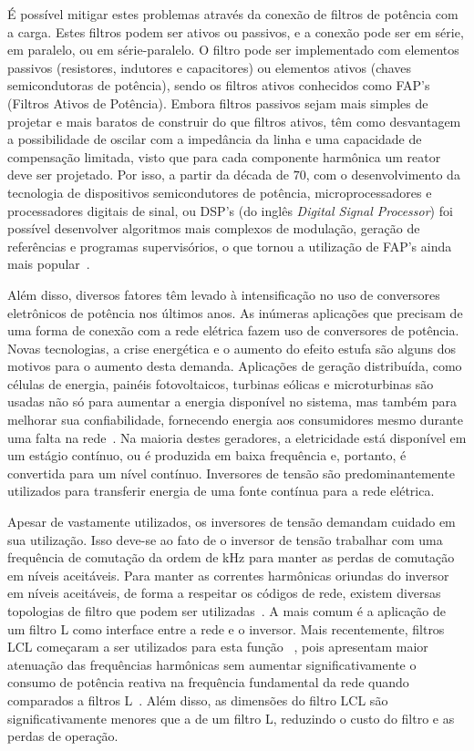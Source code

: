 	É possível mitigar estes problemas através da conexão de filtros de potência
	com a carga. Estes filtros podem ser ativos ou passivos, e a conexão pode ser
	em série, em paralelo, ou em série-paralelo. O filtro pode ser implementado
	com elementos passivos (resistores, indutores e capacitores) ou elementos
	ativos (chaves semicondutoras de potência), sendo os filtros ativos conhecidos
	como FAP's (Filtros Ativos de Potência). Embora filtros passivos sejam mais
	simples de projetar e mais baratos de construir do que filtros ativos, têm como
	desvantagem a possibilidade de oscilar com a impedância da linha e uma capacidade
	de compensação limitada, visto que para cada componente harmônica um reator
	deve ser projetado. Por isso, a partir da década de $70$, com o desenvolvimento
	da tecnologia de dispositivos semicondutores de potência, microprocessadores e
	processadores digitais de sinal, ou DSP's (do inglês \emph{Digital Signal
	Processor}) foi possível desenvolver algoritmos mais complexos de modulação,
	geração de referências e programas supervisórios, o que tornou a utilização de
	FAP's ainda mais popular~\cite{ref:SASAKI}.

	Além disso, diversos fatores têm levado à intensificação no uso de conversores
	eletrônicos	de potência nos últimos anos. As inúmeras aplicações que precisam de
	uma forma de conexão com a rede elétrica fazem uso de conversores de potência.
	Novas tecnologias, a crise energética e o aumento do efeito estufa são alguns dos
	motivos para o aumento desta demanda. Aplicações de geração distribuída, como
	células de energia,	painéis fotovoltaicos, turbinas eólicas e microturbinas são
	usadas não só para aumentar a energia disponível no sistema, mas também para
	melhorar sua confiabilidade, fornecendo energia aos consumidores mesmo durante
	uma falta na rede~\cite{ref:KARSHENAS}.	Na maioria destes geradores, a eletricidade
	está disponível em um estágio contínuo, ou é produzida em baixa frequência e,
	portanto, é convertida para um nível contínuo. Inversores de tensão são
	predominantemente utilizados para transferir energia de uma fonte contínua para
	a rede elétrica.

	Apesar de vastamente utilizados, os inversores de tensão demandam cuidado
	em sua utilização. Isso deve-se ao fato de o inversor de tensão trabalhar
	com uma frequência de comutação da ordem de kHz para manter as perdas de
	comutação em níveis aceitáveis. Para manter as correntes harmônicas oriundas
	do inversor em níveis aceitáveis, de forma a respeitar os códigos de
	rede, existem diversas topologias de filtro que podem ser
	utilizadas~\cite{ref:RIBEIRO}. A mais comum é a aplicação de um filtro L como
	interface entre a rede e o inversor. Mais recentemente, filtros LCL começaram
	a ser utilizados para esta função~\cite{ref:LINDGREN}\cite{ref:TEODORESCU}
	\cite{ref:XU}, pois apresentam maior atenuação das frequências harmônicas sem
	aumentar significativamente o consumo de potência reativa na frequência
	fundamental da rede quando comparados a filtros L~\cite{ref:FUCHS}. Além disso,
	as dimensões do filtro LCL são significativamente menores que a de um filtro L,
	reduzindo o custo do filtro e as perdas de operação.


